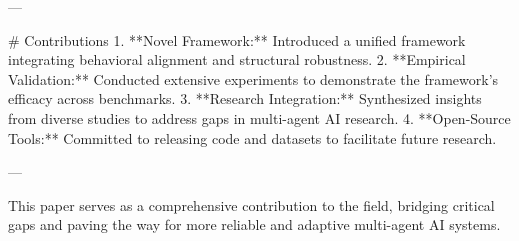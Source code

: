 ---

# Contributions  
1. **Novel Framework:** Introduced a unified framework integrating behavioral alignment and structural robustness.  
2. **Empirical Validation:** Conducted extensive experiments to demonstrate the framework's efficacy across benchmarks.  
3. **Research Integration:** Synthesized insights from diverse studies to address gaps in multi-agent AI research.  
4. **Open-Source Tools:** Committed to releasing code and datasets to facilitate future research.  

---

This paper serves as a comprehensive contribution to the field, bridging critical gaps and paving the way for more reliable and adaptive multi-agent AI systems.